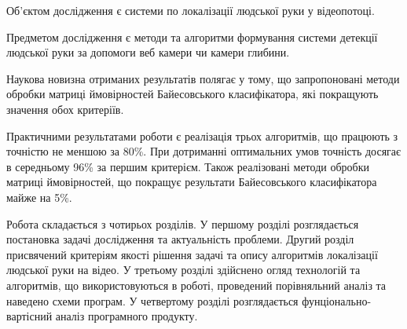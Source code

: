Об'єктом дослідження є системи по локалізації людської руки у відеопотоці.

Предметом дослідження є методи та алгоритми формування системи детекції людської руки за допомоги веб камери чи камери глибини.

Наукова новизна отриманих результатів полягає у тому, що запропоновані методи обробки матриці ймовірностей Байесовського класифікатора, які покращують значення обох критеріїв. 

Практичними результатами роботи є реалізація трьох алгоритмів, що працюють з точністю не меншою за 80\%. При дотриманні оптимальних умов точність досягає в середньому 96\% за першим критерієм. Також реалізовані методи обробки матриці ймовірностей, що покращує результати Байесовського класифікатора майже на 5\%.

Робота складається з чотирьох розділів. У першому розділі розглядається постановка задачі дослідження та актуальність проблеми. Другий розділ присвячений критеріям якості рішення задачі та опису алгоритмів локалізації людської руки на відео. У третьому розділі здійснено огляд технологій та алгоритмів, що використовуються в роботі, проведений порівняльний аналіз та наведено схеми програм. У четвертому розділі розглядається фунціонально-вартісний аналіз програмного продукту.
